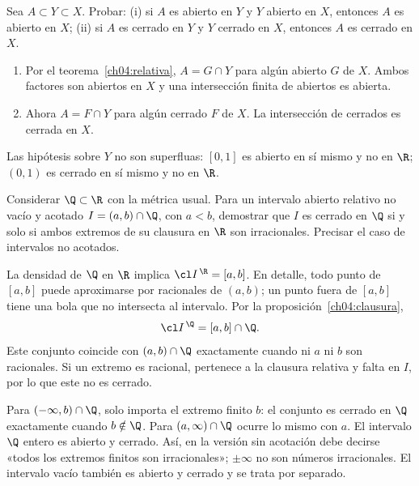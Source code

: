 \begin{ejercicio}\label{ej:lectura-4-2}
Sea $A\subset Y\subset X$. Probar: (i) si $A$ es abierto en $Y$ y $Y$ abierto en $X$, entonces $A$ es abierto en $X$; (ii) si $A$ es cerrado en $Y$ y $Y$ cerrado en $X$, entonces $A$ es cerrado en $X$.
\end{ejercicio}
\begin{solucion}
\begin{enumerate}[label=(\roman*)]
\item Por el teorema~\ref{ch04:relativa}, $A=G\cap Y$ para algún abierto $G$ de $X$. Ambos factores son abiertos en $X$ y una intersección finita de abiertos es abierta.
\item Ahora $A=F\cap Y$ para algún cerrado $F$ de $X$. La intersección de cerrados es cerrada en $X$.
\end{enumerate}
Las hipótesis sobre $Y$ no son superfluas: $[0,1]$ es abierto en sí mismo y no en $\R$; $(0,1)$ es cerrado en sí mismo y no en $\R$.
\end{solucion}

\begin{ejercicio}\label{ej:lectura-4-3}
Considerar $\Q\subset\R$ con la métrica usual. Para un intervalo abierto relativo no vacío y acotado $I=(a,b)\cap\Q$, con $a<b$, demostrar que $I$ es cerrado en $\Q$ si y solo si ambos extremos de su clausura en $\R$ son irracionales. Precisar el caso de intervalos no acotados.
\end{ejercicio}
\begin{solucion}
La densidad de $\Q$ en $\R$ implica $\cl I^{\,\R}=[a,b]$. En detalle, todo punto de $[a,b]$ puede aproximarse por racionales de $(a,b)$; un punto fuera de $[a,b]$ tiene una bola que no intersecta al intervalo. Por la proposición~\ref{ch04:clausura},
\[
\cl I^{\,\Q}=[a,b]\cap\Q.
\]
Este conjunto coincide con $(a,b)\cap\Q$ exactamente cuando ni $a$ ni $b$ son racionales. Si un extremo es racional, pertenece a la clausura relativa y falta en $I$, por lo que este no es cerrado.

Para $(-\infty,b)\cap\Q$, solo importa el extremo finito $b$: el conjunto es cerrado en $\Q$ exactamente cuando $b\notin\Q$. Para $(a,\infty)\cap\Q$ ocurre lo mismo con $a$. El intervalo $\Q$ entero es abierto y cerrado. Así, en la versión sin acotación debe decirse «todos los extremos finitos son irracionales»; $\pm\infty$ no son números irracionales. El intervalo vacío también es abierto y cerrado y se trata por separado.
\end{solucion}

